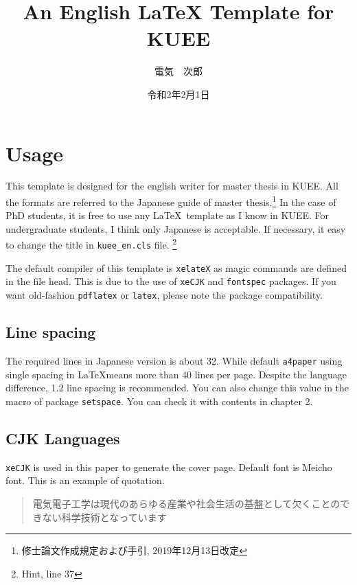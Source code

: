 \documentclass{kuee_en}
\title{An English \LaTeX{} Template for KUEE}
\author{{電気　次郎}} %
\date{{令和2年2月1日}}
\begin{document}
\maketitle

\begin{abstract}
    \lipsum[1]
\end{abstract}

\tableofcontents

\chapter{Usage}

This template is designed for the english writer for master thesis in KUEE. All the formats are referred to the Japanese guide of master thesis.\footnote{修士論文作成規定および手引, 2019年12月13日改定}
In the case of PhD students, it is free to use any \LaTeX ~template as I know in KUEE. For undergraduate students, I think only Japanese is acceptable. If necessary, it easy to change the title in \verb|kuee_en.cls| file.
\footnote{Hint, line 37}

The default compiler of this template is \verb|xelateX| as magic commands are defined in the file head. This is due to the use of \verb|xeCJK| and \verb|fontspec| packages. If you want old-fashion \verb|pdflatex| or \verb|latex|, please note the package compatibility.

\section{Line spacing}
The required lines in Japanese version is about 32. While default \verb|a4paper| using single spacing in \LaTeX means more than 40 lines per page. Despite the language difference, 1.2 line spacing is recommended. You can also change this value in the macro of package \verb|setspace|. You can check it with contents in chapter 2.



\section{CJK Languages}

\verb|xeCJK| is used in this paper to generate the cover page. Default font is Meicho font.
This is an example of quotation.
\begin{quote}
電気電子工学は現代のあらゆる産業や社会生活の基盤として欠くことのできない科学技術となっています
\end{quote}
\end{document}
